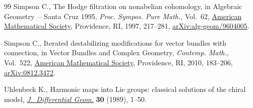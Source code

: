 \documentclass[pdftex]{sigma}
\numberwithin{equation}{section}
\theoremstyle{definition}
\begin{document}
\begin{thebibliography}{99}
Simpson C., The {H}odge filtration on nonabelian cohomology, in Algebraic
 {G}eometry~-- {S}anta {C}ruz 1995, \textit{Proc. Sympos. Pure Math.},
 Vol.~62, \href{https://doi.org/10.1090/pspum/062.2/1492538}{American
 Mathematical Society}, Providence, RI, 1997, 217--281,
 \href{http://arxiv.org/abs/alg-geom/9604005}{arXiv:alg-geom/9604005}.

Simpson C., Iterated destabilizing modifications for vector bundles with
 connection, in Vector {B}undles and {C}omplex {G}eometry, \textit{Contemp.
 Math.}, Vol.~522, \href{https://doi.org/10.1090/conm/522/10300}{American
 Mathematical Society}, Providence, RI, 2010, 183--206,
 \href{http://arxiv.org/abs/0812.3472}{arXiv:0812.3472}.

Uhlenbeck K., Harmonic maps into {L}ie groups: classical solutions of the
 chiral model,
 \href{https://doi.org/10.4310/jdg/1214443286}{\textit{J.~Differential Geom.}}
 \textbf{30} (1989), 1--50.

\end{thebibliography}\LastPageEnding
\end{document}
